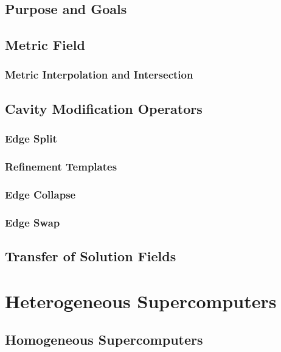 \subsection{Purpose and Goals}

\subsection{Metric Field}

\subsubsection{Metric Interpolation and Intersection}

\subsection{Cavity Modification Operators}

\subsubsection{Edge Split}

\subsubsection{Refinement Templates}

\subsubsection{Edge Collapse}

\subsubsection{Edge Swap}

\subsection{Transfer of Solution Fields}

\section{Heterogeneous Supercomputers}

\subsection{Homogeneous Supercomputers}

